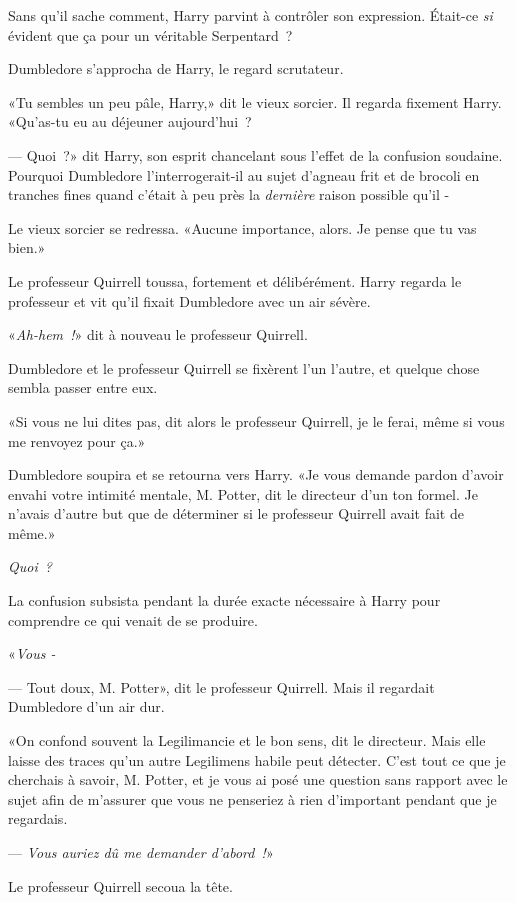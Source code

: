 Sans qu'il sache comment, Harry parvint à contrôler son expression. Était-ce \emph{si} évident que ça pour un véritable Serpentard~?

Dumbledore s'approcha de Harry, le regard scrutateur.

«Tu sembles un peu pâle, Harry,» dit le vieux sorcier. Il regarda fixement Harry. «Qu'as-tu eu au déjeuner aujourd'hui~?

--- Quoi~?» dit Harry, son esprit chancelant sous l'effet de la confusion soudaine. Pourquoi Dumbledore l'interrogerait-il au sujet d'agneau frit et de brocoli en tranches fines quand c'était à peu près la \emph{dernière} raison possible qu'il -

Le vieux sorcier se redressa. «Aucune importance, alors. Je pense que tu vas bien.»

Le professeur Quirrell toussa, fortement et délibérément. Harry regarda le professeur et vit qu'il fixait Dumbledore avec un air sévère.

«\emph{Ah-hem~!}» dit à nouveau le professeur Quirrell.

Dumbledore et le professeur Quirrell se fixèrent l'un l'autre, et quelque chose sembla passer entre eux.

«Si vous ne lui dites pas, dit alors le professeur Quirrell, je le ferai, même si vous me renvoyez pour ça.»

Dumbledore soupira et se retourna vers Harry. «Je vous demande pardon d'avoir envahi votre intimité mentale, M. Potter, dit le directeur d'un ton formel. Je n'avais d'autre but que de déterminer si le professeur Quirrell avait fait de même.»

\emph{Quoi~?}

La confusion subsista pendant la durée exacte nécessaire à Harry pour comprendre ce qui venait de se produire.

«\emph{Vous -}

--- Tout doux, M. Potter», dit le professeur Quirrell. Mais il regardait Dumbledore d'un air dur.

«On confond souvent la Legilimancie et le bon sens, dit le directeur. Mais elle laisse des traces qu'un autre Legilimens habile peut détecter. C'est tout ce que je cherchais à savoir, M. Potter, et je vous ai posé une question sans rapport avec le sujet afin de m'assurer que vous ne penseriez à rien d'important pendant que je regardais.

--- \emph{Vous auriez dû me demander d'abord~!}»

Le professeur Quirrell secoua la tête.

